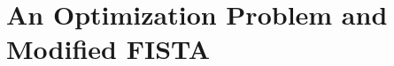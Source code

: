 \documentclass[11pt]{article}
\begin{document}


\section{An Optimization Problem and Modified FISTA}\label{sec:CNO} 
\end{document}
